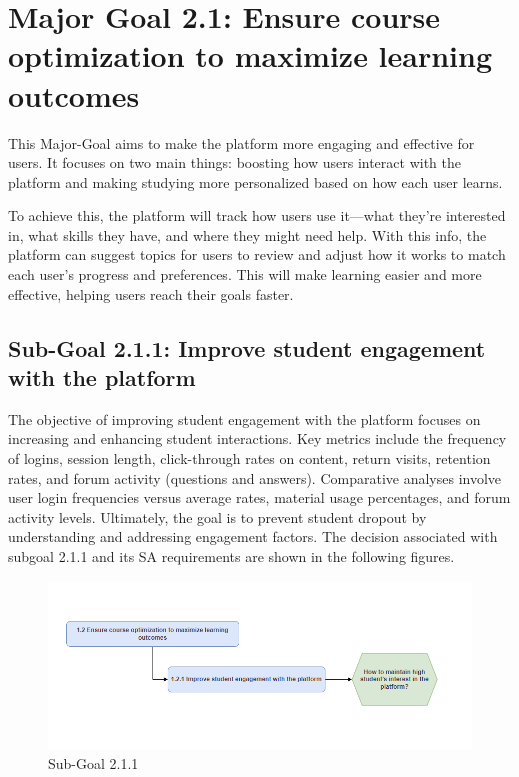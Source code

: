 \newpage
\section{Major Goal 2.1: Ensure course optimization to maximize learning outcomes}
This Major-Goal aims to make the platform more engaging and effective for users. It focuses on two main things: boosting how users interact with the platform and making studying more personalized based on how each user learns.

To achieve this, the platform will track how users use it—what they're interested in, what skills they have, and where they might need help. With this info, the platform can suggest topics for users to review and adjust how it works to match each user's progress and preferences. This will make learning easier and more effective, helping users reach their goals faster.

\subsection{Sub-Goal 2.1.1: Improve student engagement with the platform}
The objective of improving student engagement with the platform focuses on increasing and enhancing student interactions. Key metrics include the frequency of logins, session length, click-through rates on content, return visits, retention rates, and forum activity (questions and answers). Comparative analyses involve user login frequencies versus average rates, material usage percentages, and forum activity levels. Ultimately, the goal is to prevent student dropout by understanding and addressing engagement factors.
The decision associated with subgoal 2.1.1 and its SA requirements are shown in the following figures.
\begin{figure}[H]
    \centering
    \includegraphics[width=\textwidth]{./assets/subgoal_1.2.1.png}
    \caption{Sub-Goal 2.1.1}
    \label{fig:subgoal1.2.1}
\end{figure}

